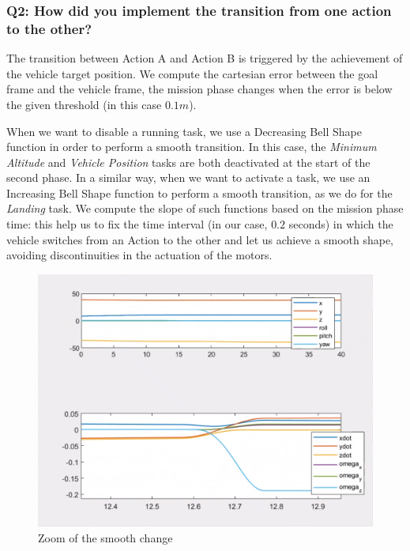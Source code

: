 \documentclass{article}
\begin{document}



\subsubsection{Q2: How did you implement the transition from one action to the other?}

The transition between Action A and Action B is triggered by the achievement of the vehicle target position. We compute the cartesian error between the goal frame and the vehicle frame, the mission phase changes when the error is below the given threshold (in this case $0.1m$). 

When we want to disable a running task, we use a Decreasing Bell Shape function in order to perform a smooth transition. In this case, the \textit{Minimum Altitude} and \textit{Vehicle Position} tasks are both deactivated at the start of the second phase. In a similar way, when we want to activate a task, we use an Increasing Bell Shape function to perform a smooth transition, as we do for the \textit{Landing} task. 
We compute the slope of such functions based on the mission phase time: this help us to fix the time interval (in our case, $0.2$ seconds) in which the vehicle switches from an Action to the other and let us achieve a smooth shape, avoiding discontinuities in the actuation of the motors.
\begin{figure}[!htb]
    \centering
    \includegraphics[scale=0.25]{222_smooth_ppdot.png}
    \caption{Zoom of the smooth change}
    \label{images_2_3_1}
\end{figure}
\end{document}
